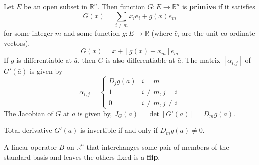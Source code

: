 \begin{definition}
	Let $E$ be an open subset in $\mathbb{R}^n$.
	Then function $G : E \to \mathbb{R}^n$ is \textbf{primive}
	if it satisfies
	\begin{equation}
		G(\bar{x}) = \sum_{i \ne m} x_i \bar{e}_i + g(\bar{x})\bar{e}_m
	\end{equation}
	for some integer $m$ and
	some function $g : E \to \mathbb{R}$
	(where $\bar{e}_i$ are the unit co-ordinate vectors).
	\begin{equation}
		G(\bar{x}) = \bar{x} + [g(\bar{x})-x_m]\bar{e}_m
	\end{equation}
	If $g$ is differentiable at $\bar{a}$, then $G$ is also differentiable at $\bar{a}$.
	The matrix $[\alpha_{i,j}]$ of $G'(\bar{a})$ is given by 
	$$\alpha_{i,j} = \begin{cases} 
		D_jg(\bar{a}) & i = m\\
		1 & i \ne m, j = i \\
		0 & i \ne m, j \ne i
	\end{cases} $$
	The Jacobian of $G$ at $\bar{a}$ is given by,
	$J_G(\bar{a}) = \det[G'(\bar{a})] = D_mg(\bar{a})$.

	Total derivative $G'(\bar{a})$ is invertible if and only if $D_mg(\bar{a}) \ne 0$.
\end{definition}

\begin{definition}
	A linear operator $B$ on $\mathbb{R}^n$ that interchanges some pair of members of the standard basis and leaves the others fixed is a \textbf{flip}.
\end{definition}

